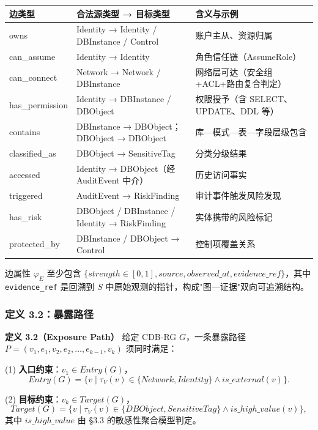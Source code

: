 \documentclass[a4paper,12pt]{ctexart}
\begin{document}
\begin{table}[htbp]
\centering
\small
\setlength{\tabcolsep}{4pt}
\begin{tabular}{|l|l|l|}
\hline
\textbf{边类型} & \textbf{合法源类型 → 目标类型} & \textbf{含义与示例} \\
\hline
owns & Identity → Identity / DBInstance / Control & 账户主从、资源归属 \\
\hline
can\_assume & Identity → Identity & 角色信任链（AssumeRole） \\
\hline
can\_connect & Network → Network / DBInstance & 网络层可达（安全组+ACL+路由复合判定） \\
\hline
has\_permission & Identity → DBInstance / DBObject & 权限授予（含 SELECT、UPDATE、DDL 等） \\
\hline
contains & DBInstance → DBObject；DBObject → DBObject & 库—模式—表—字段层级包含 \\
\hline
classified\_as & DBObject → SensitiveTag & 分类分级结果 \\
\hline
accessed & Identity → DBObject（经 AuditEvent 中介） & 历史访问事实 \\
\hline
triggered & AuditEvent → RiskFinding & 审计事件触发风险发现 \\
\hline
has\_risk & DBObject / DBInstance / Identity → RiskFinding & 实体携带的风险标记 \\
\hline
protected\_by & DBInstance / DBObject → Control & 控制项覆盖关系 \\
\hline
\end{tabular}
\end{table}

边属性 $\varphi_E$ 至少包含 $\{strength \in [0,1], source, observed\_at, evidence\_ref\}$，其中 \texttt{evidence\_ref} 是回溯到 $S$ 中原始观测的指针，构成"图—证据"双向可追溯结构。

\subsubsection{定义 3.2：暴露路径}

\textbf{定义 3.2（Exposure Path）} 给定 CDB-RG $G$，一条暴露路径 $P = (v_1, e_1, v_2, e_2, \ldots, e_{k-1}, v_k)$ 须同时满足：

(1) \textbf{入口约束}：$v_1 \in Entry(G)$，
\[Entry(G) = \{v \mid \tau_V(v) \in \{Network, Identity\} \land is\_external(v)\}.\]

(2) \textbf{目标约束}：$v_k \in Target(G)$，
\[Target(G) = \{v \mid \tau_V(v) \in \{DBObject, SensitiveTag\} \land is\_high\_value(v)\},\]
其中 $is\_high\_value$ 由 §3.3 的敏感性聚合模型判定。
\end{document}
